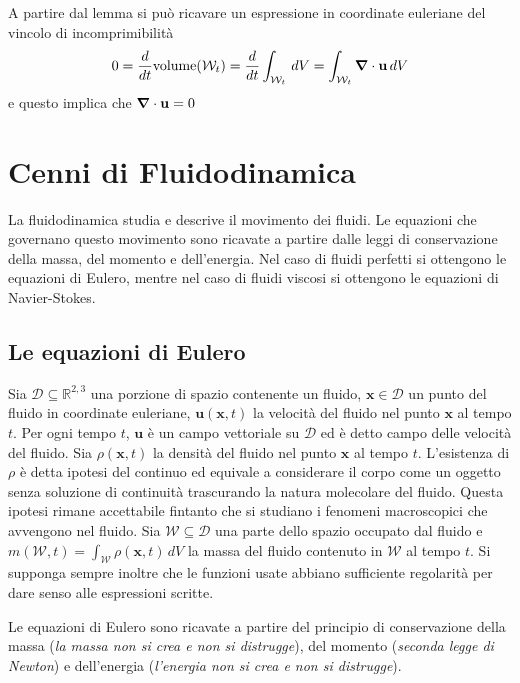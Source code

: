 A partire dal lemma si può ricavare un espressione in coordinate euleriane del vincolo di incomprimibilità
\begin{equation}
0 = \frac{d}{dt}\text{volume}(\mathcal{W}_t) = \frac{d}{dt}\int_{\mathcal{W}_t}\,dV = \int_{\mathcal{W}_t} \boldsymbol{\nabla} \cdot \mathbf{u}\,dV
\end{equation}
e questo implica che $\boldsymbol{\nabla} \cdot \mathbf{u} = 0$

\section{Cenni di Fluidodinamica}

La fluidodinamica studia e descrive il movimento dei fluidi. Le equazioni che governano questo movimento sono ricavate a partire dalle leggi di conservazione della massa, del momento e dell'energia. Nel caso di fluidi perfetti si ottengono le equazioni di Eulero, mentre nel caso di fluidi viscosi si ottengono le equazioni di Navier-Stokes.

\subsection{Le equazioni di Eulero}

Sia $\mathcal{D} \subseteq \mathbb{R}^{2,3}$ una porzione di spazio contenente un fluido, $\mathbf{x} \in \mathcal{D}$ un punto del fluido in coordinate euleriane, $\mathbf{u}(\mathbf{x},t)$ la velocità del fluido nel punto $\mathbf{x}$ al tempo $t$. Per ogni tempo $t$, $\mathbf{u}$ è un campo vettoriale su $\mathcal{D}$ ed è detto campo delle velocità del fluido. Sia $\rho(\mathbf{x},t)$ la densità del fluido nel punto $\mathbf{x}$ al tempo $t$.  L'esistenza di $\rho$ è detta ipotesi del continuo ed equivale a considerare il corpo come un oggetto senza soluzione di continuità trascurando la natura molecolare del fluido. Questa ipotesi rimane accettabile fintanto che si studiano i fenomeni macroscopici che avvengono nel fluido. Sia $\mathcal{W} \subseteq \mathcal{D}$ una parte dello spazio occupato dal fluido e $m(\mathcal{W},t)= \int_{\mathcal{W}}\rho(\mathbf{x},t) \, dV$ la massa del fluido contenuto in $\mathcal{W}$ al tempo $t$. Si supponga sempre inoltre che le funzioni usate abbiano sufficiente regolarità per dare senso alle espressioni scritte. 

Le equazioni di Eulero sono ricavate a partire del principio di conservazione della massa (\emph{la massa non si crea e non si distrugge}), del momento (\emph{seconda legge di Newton}) e dell'energia (\emph{l'energia non si crea e non si distrugge}).

